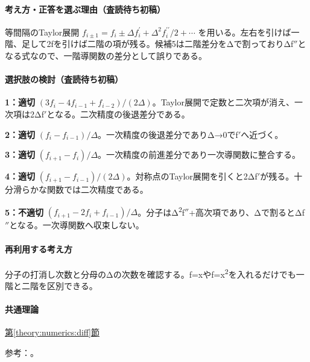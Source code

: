 \paragraph{考え方・正答を選ぶ理由（査読待ち初稿）} 等間隔のTaylor展開 \(f_{i\pm1}=f_i\pm\Delta f_i^\prime+\Delta^2f_i^{\prime\prime}/2+\cdots\) を用いる。左右を引けば一階、足して2fを引けば二階の項が残る。候補5は二階差分をΔで割っておりΔf\ensuremath{''}となる式なので、一階導関数の差分として誤りである。

\paragraph{選択肢の検討（査読待ち初稿）}\mbox{}\par

\noindent\textbf{1：適切} \((3f_i-4f_{i-1}+f_{i-2})/(2\Delta)\)。Taylor展開で定数と二次項が消え、一次項は2Δf\ensuremath{'}となる。二次精度の後退差分である。\par

\noindent\textbf{2：適切} \((f_i-f_{i-1})/\Delta\)。一次精度の後退差分でありΔ→0でf\ensuremath{'}へ近づく。\par

\noindent\textbf{3：適切} \((f_{i+1}-f_i)/\Delta\)。一次精度の前進差分であり一次導関数に整合する。\par

\noindent\textbf{4：適切} \((f_{i+1}-f_{i-1})/(2\Delta)\)。対称点のTaylor展開を引くと2Δf\ensuremath{'}が残る。十分滑らかな関数では二次精度である。\par

\noindent\textbf{5：不適切} \((f_{i+1}-2f_i+f_{i-1})/\Delta\)。分子はΔ\textsuperscript{2}f\ensuremath{''}+高次項であり、Δで割るとΔf\ensuremath{''}となる。一次導関数へ収束しない。\par

\paragraph{再利用する考え方} 分子の打消し次数と分母のΔの次数を確認する。f=\allowbreak{}xやf=\allowbreak{}x\textsuperscript{2}を入れるだけでも一階と二階を区別できる。

\paragraph{共通理論} \hyperref[theory:numerics:diff]{第\ref*{theory:numerics:diff}節}

\par 参考：\cite{nist_differentiation}。

